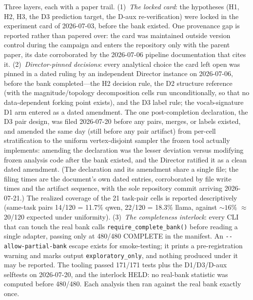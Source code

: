 \documentclass{article}
\begin{document}
Three layers, each with a paper trail. (1)~\emph{The locked card}: the
hypotheses (H1, H2, H3, the D3 prediction target, the D-aux
re-verification) were locked in the experiment card of 2026-07-03, before
the bank existed. One provenance gap is reported rather than papered over:
the card was maintained outside version control during the campaign and
enters the repository only with the parent paper, its date corroborated by
the 2026-07-06 pipeline documentation that cites it.
(2)~\emph{Director-pinned decisions}: every analytical
choice the card left open was pinned in a dated ruling by an independent
Director instance on 2026-07-06, before the bank completed---the H2
decision rule, the D2 structure reference (with the magnitude/topology
decomposition cells run unconditionally, so that no data-dependent forking
point exists), and the D3 label rule; the vocab-signature D1 arm entered as
a dated amendment. The one post-completion declaration, the D3 pair design,
was filed 2026-07-20 before any pairs, merges, or labels existed, and
amended the same day (still before any pair artifact) from per-cell
stratification to the uniform vertex-disjoint sampler the frozen tool
actually implements: amending the declaration was the lesser deviation
versus modifying frozen analysis code after the bank existed, and the
Director ratified it as a clean dated amendment. (The declaration and its
amendment share a single file; the filing times are the document's own
dated entries, corroborated by file write times and the artifact sequence,
with the sole repository commit arriving 2026-07-21.) The realized
coverage of the 21 task-pair cells is reported descriptively (same-task
pairs 14/120 = 11.7\% qwen, 22/120 = 18.3\% llama, against ${\sim}16\%$
$\approx$ 20/120 expected under uniformity). (3)~\emph{The completeness
interlock}: every CLI that can touch the real bank calls
\texttt{require\_complete\_bank()} before reading a single adapter, passing
only at 480/480 COMPLETE in the manifest. An
\texttt{-{}-allow-partial-bank} escape exists for smoke-testing; it prints
a pre-registration warning and marks output \texttt{exploratory\_only},
and nothing produced under it may be reported. The tooling passed 171/171
tests plus the D1/D3/D-aux selftests on 2026-07-20, and the interlock HELD:
no real-bank statistic was computed before 480/480. Each analysis then ran
against the real bank exactly once.
\end{document}
